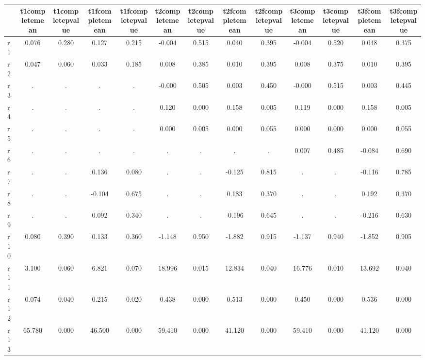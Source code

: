 \begin{table}[htbp]
\begin{tabular}{lcccccccccccc} \hline \hline
 & t1completemean  & t1completepvalue  & t1fcompletemean  & t1fcompletepvalue  & t2completemean  & t2completepvalue  & t2fcompletemean  & t2fcompletepvalue  & t3completemean  & t3completepvalue  & t3fcompletemean  & t3fcompletepvalue  \\  \hline 
r1 &     0.076 &     0.280 &     0.127 &     0.215 &    -0.004 &     0.515 &     0.040 &     0.395 &    -0.004 &     0.520 &     0.048 &     0.375 \\  
r2 &     0.047 &     0.060 &     0.033 &     0.185 &     0.008 &     0.385 &     0.010 &     0.395 &     0.008 &     0.375 &     0.010 &     0.395 \\  
r3 &         . &         . &         . &         . &    -0.000 &     0.505 &     0.003 &     0.450 &    -0.000 &     0.515 &     0.003 &     0.445 \\  
r4 &         . &         . &         . &         . &     0.120 &     0.000 &     0.158 &     0.005 &     0.119 &     0.000 &     0.158 &     0.005 \\  
r5 &         . &         . &         . &         . &     0.000 &     0.005 &     0.000 &     0.055 &     0.000 &     0.000 &     0.000 &     0.055 \\  
r6 &         . &         . &         . &         . &         . &         . &         . &         . &     0.007 &     0.485 &    -0.084 &     0.690 \\  
r7 &         . &         . &     0.136 &     0.080 &         . &         . &    -0.125 &     0.815 &         . &         . &    -0.116 &     0.785 \\  
r8 &         . &         . &    -0.104 &     0.675 &         . &         . &     0.183 &     0.370 &         . &         . &     0.192 &     0.370 \\  
r9 &         . &         . &     0.092 &     0.340 &         . &         . &    -0.196 &     0.645 &         . &         . &    -0.216 &     0.630 \\  
r10 &     0.080 &     0.390 &     0.133 &     0.360 &    -1.148 &     0.950 &    -1.882 &     0.915 &    -1.137 &     0.940 &    -1.852 &     0.905 \\  
r11 &     3.100 &     0.060 &     6.821 &     0.070 &    18.996 &     0.015 &    12.834 &     0.040 &    16.776 &     0.010 &    13.692 &     0.040 \\  
r12 &     0.074 &     0.040 &     0.215 &     0.020 &     0.438 &     0.000 &     0.513 &     0.000 &     0.450 &     0.000 &     0.536 &     0.000 \\  
r13 &    65.780 &     0.000 &    46.500 &     0.000 &    59.410 &     0.000 &    41.120 &     0.000 &    59.410 &     0.000 &    41.120 &     0.000 \\  
\hline \hline \end{tabular}
\end{table}
